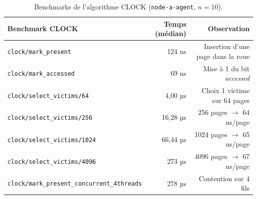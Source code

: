 \begin{table}[H]
\centering
\small
\caption{Benchmarks de l'algorithme CLOCK (\texttt{node-a-agent}, $n=10$).}
\begin{tabular}{lrr}
\toprule
\textbf{Benchmark CLOCK} & \textbf{Temps (médian)} & \textbf{Observation} \\
\midrule
\texttt{clock/mark\_present}            & 124 ns                & Insertion d'une page dans la roue \\
\texttt{clock/mark\_accessed}           & 69 ns                 & Mise à 1 du bit \emph{accessed} \\
\texttt{clock/select\_victims/64}       & 4{,}00 µs             & Choix 1 victime sur 64 pages \\
\texttt{clock/select\_victims/256}      & 16{,}28 µs            & 256 pages $\to$ 64 ns/page \\
\texttt{clock/select\_victims/1024}     & 66{,}44 µs            & 1024 pages $\to$ 65 ns/page \\
\texttt{clock/select\_victims/4096}     & 273 µs                & 4096 pages $\to$ 67 ns/page \\
\texttt{clock/mark\_present\_concurrent\_4threads} & 278 µs    & Contention sur 4 fils \\
\bottomrule
\end{tabular}
\label{tab:bench-clock}
\end{table}

